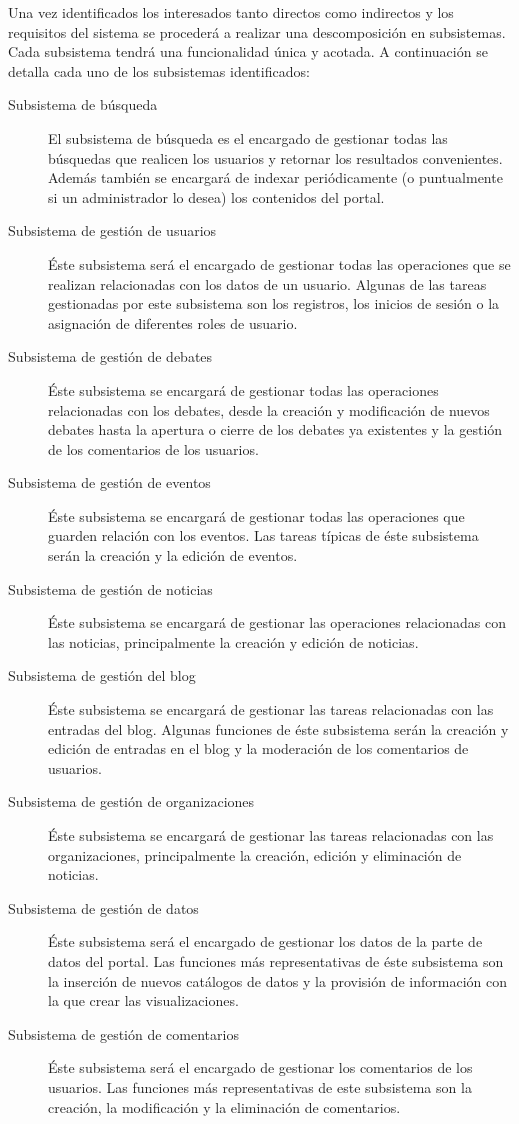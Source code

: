Una vez identificados los interesados tanto directos como indirectos y los requisitos del sistema se procederá a realizar una descomposición en subsistemas.  Cada subsistema tendrá una funcionalidad única y acotada.\newline
A continuación se detalla cada uno de los subsistemas identificados:

\begin{description}
\item[Subsistema de búsqueda]  El subsistema de búsqueda es el encargado de gestionar todas las búsquedas que realicen los usuarios y retornar los resultados convenientes.  Además también se encargará de indexar periódicamente (o puntualmente si un administrador lo desea) los contenidos del portal.
\item[Subsistema de gestión de usuarios]  Éste subsistema será el encargado de gestionar todas las operaciones que se realizan relacionadas con los datos de un usuario.  Algunas de las tareas gestionadas por este subsistema son los registros, los inicios de sesión o la asignación de diferentes roles de usuario.
\item[Subsistema de gestión de debates]  Éste subsistema se encargará de gestionar todas las operaciones relacionadas con los debates, desde la creación y modificación de nuevos debates hasta la apertura o cierre de los debates ya existentes y la gestión de los comentarios de los usuarios.
\item[Subsistema de gestión de eventos]  Éste subsistema se encargará de gestionar todas las operaciones que guarden relación con los eventos.  Las tareas típicas de éste subsistema serán la creación y la edición de eventos.
\item[Subsistema de gestión de noticias]  Éste subsistema se encargará de gestionar las operaciones relacionadas con las noticias, principalmente la creación y edición de noticias.
\item[Subsistema de gestión del blog]  Éste subsistema se encargará de gestionar las tareas relacionadas con las entradas del blog.  Algunas funciones de éste subsistema serán la creación y edición de entradas en el blog y la moderación de los comentarios de usuarios.
\item[Subsistema de gestión de organizaciones]  Éste subsistema se encargará de gestionar las tareas relacionadas con las organizaciones, principalmente la creación, edición y eliminación de noticias.
\item[Subsistema de gestión de datos]  Éste subsistema será el encargado de gestionar los datos de la parte de datos del portal.  Las funciones más representativas de éste subsistema son la inserción de nuevos catálogos de datos y la provisión de información con la que crear las visualizaciones.
\item[Subsistema de gestión de comentarios]  Éste subsistema será el encargado de gestionar los comentarios de los usuarios.  Las funciones más representativas de este subsistema son la creación, la modificación y la eliminación de comentarios.
\end{description}

